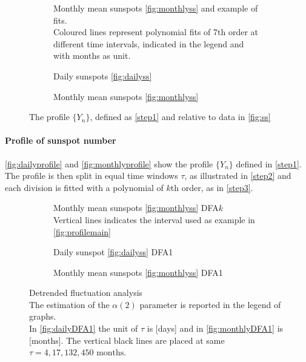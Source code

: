 \begin{figure}[!h]
	\centering
	\begin{subfigure}{\textwidth}
		\centering
		
		\caption{Monthly mean sunspots \ref{fig:monthlyss} and example of fits. \\ 
			Coloured lines represent polynomial fits of 7th order at different time intervals, indicated in the legend and with months as unit.}\label{fig:profilemain}
	\end{subfigure}
	\vfill
	\begin{subfigure}{0.48\textwidth}
		\centering
		
		\caption{Daily sunspots \ref{fig:dailyss}}\label{fig:dailyprofile}
	\end{subfigure}
	\hfill
	\begin{subfigure}{0.48\textwidth}
		
		\caption{Monthly mean sunspots \ref{fig:monthlyss}}\label{fig:monthlyprofile}
	\end{subfigure}
	\caption{The profile $\{Y_n\}$, defined as \autoref{step1} and relative to data in \autoref{fig:ss}}\label{fig:profile}
\end{figure}

\paragraph{Profile of sunspot number}
\autoref{fig:dailyprofile} and \autoref{fig:monthlyprofile} show the profile $\{Y_n\}$ defined in \autoref{step1}. \\
The profile is then split in equal time windows $\tau$, as illustrated in \autoref{step2} and each division is fitted with a polynomial of $k$th order, as in \autoref{step3}.

\begin{figure}[!h]
	\centering
	\begin{subfigure}{\textwidth}
		\centering
		
		\caption{Monthly mean sunspots \ref{fig:monthlyss} DFA$k$\\ Vertical lines indicates the interval used as example in \autoref{fig:profilemain}}\label{fig:DFAk}
	\end{subfigure}
	\vfill
	\begin{subfigure}{0.48\textwidth}
		\centering
		
		\caption{Daily sunspot \ref{fig:dailyss} DFA1}\label{fig:dailyDFA1}
	\end{subfigure}
	\hfill
	\begin{subfigure}{0.48\textwidth}
		\centering
		
		\caption{Monthly mean sunspots \ref{fig:monthlyss} DFA1}\label{fig:monthlyDFA1}
	\end{subfigure}
	\caption{Detrended fluctuation analysis\\
		The estimation of the $\alpha(2)$ parameter is reported in the legend of graphs.\\
		In \autoref{fig:dailyDFA1} the unit of $\tau$ is [days] and in \autoref{fig:monthlyDFA1} is [months]. The vertical black lines are placed at same $\tau = 4,17, 132, 450 \text{ months}$.}\label{fig:DFA}
\end{figure}

